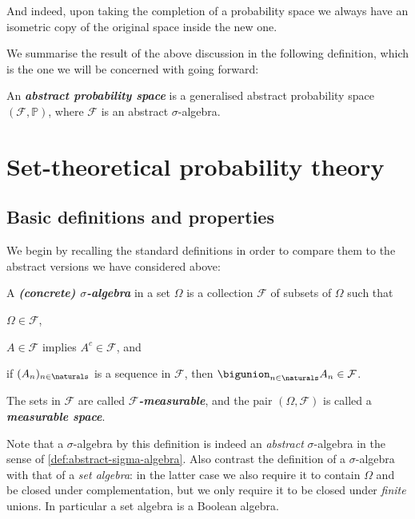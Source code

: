 \documentclass[article, a4paper, 11pt, oneside]{memoir}
\numberwithin{equation}{chapter}
\newcommand{\calF}{\mathcal{F}}
\renewcommand{\P}{\mathbb{P}}
\newcommand{\keyword}[1]{{\itshape\bfseries #1}}
\begin{document}
%
And indeed, upon taking the completion of a probability space we always have an isometric copy of the original space inside the new one.

We summarise the result of the above discussion in the following definition, which is the one we will be concerned with going forward:

\begin{definition}
    \label{def:abstract-probability-space}
    An \keyword{abstract probability space} is a generalised abstract probability space $(\calF, \P)$, where $\calF$ is an abstract $\sigma$-algebra.
\end{definition}


\chapter{Set-theoretical probability theory}

\section{Basic definitions and properties}

We begin by recalling the standard definitions in order to compare them to the abstract versions we have considered above:

\begin{definition}
    A \keyword{(concrete) $\sigma$-algebra} in a set $\Omega$ is a collection $\calF$ of subsets of $\Omega$ such that
    \begin{enumdef}
        \item $\Omega \in \calF$,
        \item $A \in \calF$ implies $A^c \in \calF$, and
        \item if $(A_n)_{n\in\naturals}$ is a sequence in $\calF$, then $\bigunion_{n\in\naturals} A_n \in \calF$.
    \end{enumdef}
    The sets in $\calF$ are called \keyword{$\calF$-measurable}, and the pair $(\Omega, \calF)$ is called a \keyword{measurable space}.
\end{definition}
%
Note that a $\sigma$-algebra by this definition is indeed an \emph{abstract} $\sigma$-algebra in the sense of \cref{def:abstract-sigma-algebra}. Also contrast the definition of a $\sigma$-algebra with that of a \emph{set algebra}: in the latter case we also require it to contain $\Omega$ and be closed under complementation, but we only require it to be closed under \emph{finite} unions. In particular a set algebra is a Boolean algebra.
\end{document}
